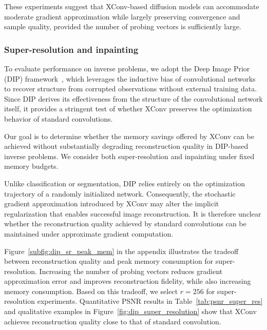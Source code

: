 \documentclass[10pt]{article}
\begin{document}
These experiments suggest that XConv-based diffusion models can accommodate moderate gradient approximation while largely preserving convergence and sample quality, provided the number of probing vectors is sufficiently large.

\subsubsection{Super-resolution and inpainting}
\label{subsubsec:super_resolution}

To evaluate performance on inverse problems, we adopt the Deep Image Prior (DIP) framework~\citep{ulyanov2018deep}, which leverages the inductive bias of convolutional networks to recover structure from corrupted observations without external training data. Since DIP derives its effectiveness from the structure of the convolutional network itself, it provides a stringent test of whether XConv preserves the optimization behavior of standard convolutions. 

Our goal is to determine whether the memory savings offered by XConv can be achieved without substantially degrading reconstruction quality in DIP-based inverse problems. We consider both super-resolution and inpainting under fixed memory budgets.

Unlike classification or segmentation, DIP relies entirely on the optimization trajectory of a randomly initialized network. Consequently, the stochastic gradient approximation introduced by XConv may alter the implicit regularization that enables successful image reconstruction. It is therefore unclear whether the reconstruction quality achieved by standard convolutions can be maintained under approximate gradient computation.

Figure~\ref{subfig:dip_sr_peak_mem} in the appendix illustrates the tradeoff between reconstruction quality and peak memory consumption for super-resolution. Increasing the number of probing vectors reduces gradient approximation error and improves reconstruction fidelity, while also increasing memory consumption. Based on this tradeoff, we select $r = 256$ for super-resolution experiments. Quantitative PSNR results in Table~\ref{tab:psnr_super_res} and qualitative examples in Figure~\ref{fig:dip_super_resolution} show that XConv achieves reconstruction quality close to that of standard convolution.
\end{document}
